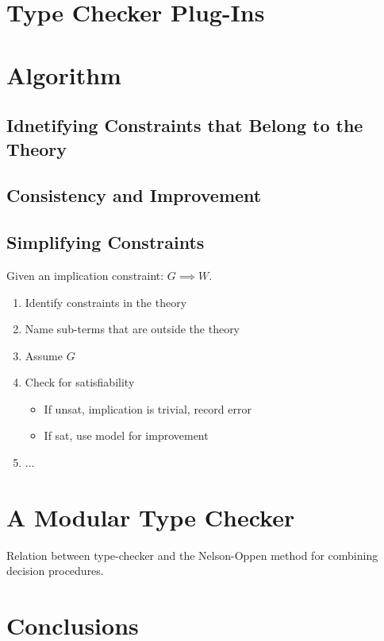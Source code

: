 \documentclass{sigplanconf}
\begin{document}
\section{Type Checker Plug-Ins}


\section{Algorithm}

\subsection{Idnetifying Constraints that Belong to the Theory}

\subsection{Consistency and Improvement}

\subsection{Simplifying Constraints}



Given an implication constraint: $G\implies W$.
\begin{enumerate}
\item Identify constraints in the theory
\item Name sub-terms that are outside the theory
\item Assume $G$
\item Check for satisfiability
  \begin{itemize}
  \item If unsat, implication is trivial, record error
  \item If sat, use model for improvement
  \end{itemize}
\item ...
\end{enumerate}


\section{A Modular Type Checker}

Relation between type-checker and
the Nelson-Oppen method for combining
decision procedures.


\section {Conclusions}









% 
% 
% 
% 
\end{document}
